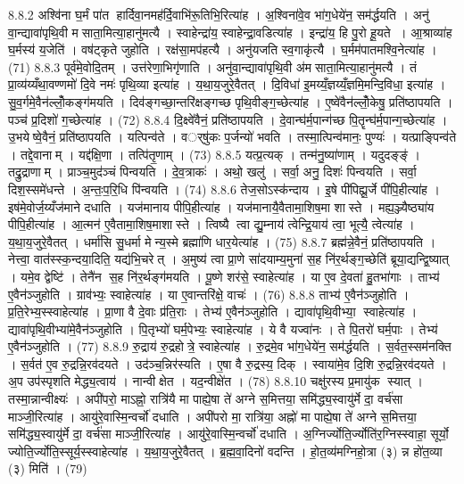 8.8.2
अश्वि॑ना घ॒र्मं पा॑त हार्दिवा॒नमह॑र्दि॒वाभि॑रू॒तिभि॒रित्या॑ह । अ॒श्विना॑वे॒व भा॑ग॒धेये॑न॒ सम॑र्द्धयति । अनु॑ वा॒न्द्यावा॑पृथि॒वी म॑साता॒मित्या॒हानु॑मत्यै । स्वाहेन्द्रा॑य॒ स्वाहेन्द्रा॒वडित्या॑ह । इन्द्रा॑य॒ हि पु॒रो हू॒यते । आ॒श्राव्या॑ह घ॒र्मस्य॑ य॒जेति॑ । वष॑ट्कृते जुहोति । रक्ष॑सा॒मप॑हत्यै । अनु॑यजति स्व॒गाकृ॑त्यै । घ॒र्मम॑पातमश्वि॒नेत्या॑ह । (71)
8.8.3
पूर्व॑मे॒वोदि॒तम् । उत्त॑रेणा॒भिगृ॑णाति । अनु॑वा॒न्द्यावा॑पृथि॒वी अ॑मसाता॒मित्या॒हानु॑मत्यै । तं प्रा॒व्य॑य्यँथा॒वण्णमो॑ दि॒वे नमः॑ पृथि॒व्या इत्या॑ह । य॒था॒य॒जुरे॒वैतत् । दि॒विधा॑ इ॒मय्यँ॒ज्ञय्यँ॒ज्ञमि॒मन्दि॒विधा॒ इत्या॑ह । सु॒व॒र्गमे॒वैन॑ल्लोँ॒कङ्ग॑मयति । दिव॑ङ्गच्छा॒न्तरि॑क्षङ्गच्छ पृथि॒वीङ्ग॒च्छेत्या॑ह । ए॒ष्वे॑वैन॑ल्लोँ॒केषु॒ प्रति॑ष्ठापयति । पञ्च॑ प्र॒दिशो॑ ग॒च्छेत्या॑ह । (72)
8.8.4
दि॒क्ष्वे॑वैनं॒ प्रति॑ष्ठापयति । दे॒वान्घ॑र्म॒पान्ग॑च्छ पि॒तॄन्घ॑र्म॒पान्ग॒च्छेत्या॑ह । उ॒भयेष्वे॒वैनं॒ प्रति॑ष्ठापयति । यत्पिन्व॑ते । वर््षु॑कः प॒र्जन्यो॑ भवति । तस्मा॒त्पिन्व॑मानः॒ पुण्यः॑ । यत्प्राङ्पिन्व॑ते । तद्दे॒वानाम् । यद्द॑क्षि॒णा । तत्पि॑तृ॒णाम् । (73)
8.8.5
यत्प्र॒त्यक् । तन्म॑नु॒ष्या॑णाम् । यदुदङ्ङ्॑ । तद्रु॒द्राणाम् । प्राञ्च॒मुद॑ञ्चं पिन्वयति । दे॒व॒त्राकः॑ । अथो॒ खलु॑ । सर्वा॒ अनु॒ दिशः॑ पिन्वयति । सर्वा॒ दिश॒स्समे॑धन्ते । अ॒न्तः॒प॒रि॒धि पि॑न्वयति । (74)
8.8.6
तेज॒सोऽस्क॑न्दाय । इ॒षे पी॑पिह्यू॒र्जे पी॑पि॒हीत्या॑ह । इष॑मे॒वोर्ज॒य्यँज॑माने दधाति । यज॑मानाय पीपि॒हीत्या॑ह । यज॑मानायै॒वैतामा॒शिष॒मा शास्ते । मह्य॒ञ्ज्यैष्ठ्या॑य पीपि॒हीत्या॑ह । आ॒त्मन॑ ए॒वैतामा॒शिष॒माशास्ते । त्विष्यै त्वा द्यु॒म्नाय॑ त्वेन्द्रि॒याय॑ त्वा॒ भूत्यै॒ त्वेत्या॑ह । य॒था॒य॒जुरे॒वैतत् । धर्मा॑सि सु॒धर्मा मेन्य॒स्मे ब्रह्मा॑णि धार॒येत्या॑ह । (75)
8.8.7
ब्रह्म॑न्ने॒वैनं॒ प्रति॑ष्ठापयति । नेत्त्वा॒ वात॑स्स्क॒न्दया॒दिति॒ यद्य॑भि॒चरेत् । अ॒मुष्य॑ त्वा प्रा॒णे सा॑दयाम्य॒मुना॑ स॒ह नि॑र॒र्थङ्ग॒च्छेति॑ ब्रूया॒द्यन्द्वि॒ष्यात् । यमे॒व द्वेष्टि॑ । तेनै॑न स॒ह नि॑र॒र्थङ्ग॑मयति । पू॒ष्णे शर॑से॒ स्वाहेत्या॑ह । या ए॒व दे॒वता॑ हु॒तभा॑गाः । ताभ्य॑ ए॒वैन॑ञ्जुहोति । ग्राव॑भ्यः॒ स्वाहेत्या॑ह । या ए॒वान्तरि॑क्षे॒ वाचः॑ । (76)
8.8.8
ताभ्य॑ ए॒वैन॑ञ्जुहोति । प्र॒ति॒रेभ्य॒स्स्वाहेत्या॑ह । प्रा॒णा वै दे॒वाः प्र॑ति॒राः । तेभ्य॑ ए॒वैन॑ञ्जुहोति । द्यावा॑पृथि॒वीभ्या॒॒ स्वाहेत्या॑ह । द्यावा॑पृथि॒वीभ्या॑मे॒वैन॑ञ्जुहोति । पि॒तृभ्यो॑ घर्म॒पेभ्यः॒ स्वाहेत्या॑ह । ये वै यज्वा॑नः । ते पि॒तरो॑ घर्म॒पाः । तेभ्य॑ ए॒वैन॑ञ्जुहोति । (77)
8.8.9
रु॒द्राय॑ रु॒द्रहोत्रे॒ स्वाहेत्या॑ह । रु॒द्रमे॒व भा॑ग॒धेये॑न॒ सम॑र्द्धयति । स॒र्वत॒स्सम॑नक्ति । स॒र्वत॑ ए॒व रु॒द्रन्नि॒रव॑दयते । उद॑ञ्च॒न्निर॑स्यति । ए॒षा वै रु॒द्रस्य॒ दिक् । स्वाया॑मे॒व दि॒शि रु॒द्रन्नि॒रव॑दयते । अ॒प उप॑स्पृशति मेद्ध्य॒त्वाय॑ । नान्वीक्षेत । यद॒न्वीक्षे॑त । (78)
8.8.10
चक्षु॑रस्य प्र॒मायु॑क स्यात् । तस्मा॒न्नान्वीक्ष्यः॑ । अपी॑परो॒ माऽह्नो॒ रात्रि॑यै मा पाह्ये॒षा ते॑ अग्ने स॒मित्तया॒ समि॑द्ध्य॒स्वायु॑र्मे दा॒ वर्च॑सा माञ्जी॒रित्या॑ह । आयु॑रे॒वास्मि॒न्वर्चो॑ दधाति । अपी॑परो मा॒ रात्रि॑या॒ अह्नो॑ मा पाह्ये॒षा ते॑ अग्ने स॒मित्तया॒ समि॑द्ध्य॒स्वायु॑र्मे दा॒ वर्च॑सा माञ्जी॒रित्या॑ह । आयु॑रे॒वास्मि॒न्वर्चो॑ दधाति । अ॒ग्निर्ज्योति॒र्ज्योति॑र॒ग्निस्स्वाहा॒ सूर्यो॒ ज्योति॒र्ज्योति॒स्सूर्य॒स्स्वाहेत्या॑ह । य॒था॒य॒जुरे॒वैतत् । ब्र॒ह्म॒वा॒दिनो॑ वदन्ति । हो॒त॒व्य॑मग्निहो॒त्रा (३) न्न हो॑त॒व्या (३) मिति॑ । (79)
